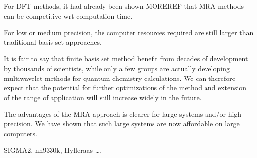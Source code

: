 \documentclass[%
 aip,
 amsmath,amssymb,
 reprint,%
]{revtex4-1}
\begin{document}

For DFT methods, it had already been shown \cite{bischoff2019} MOREREF that MRA methods can be competitive wrt computation time.

For low or medium precision, the computer resources required are still larger than traditional basis set approaches. 



It is fair to say that finite basis set method benefit from decades of development by thousands of scientists, while only a few groups are actually developing multiwavelet methods for quantum chemistry calculations. We can therefore expect that the potential for further optimizations of the method and extension of the range of application will still increase widely in the future.

The advantages of the MRA approach is clearer for large systems and/or high precision. We have shown that such large systems are now affordable on large computers.



\begin{acknowledgments}
SIGMA2, nn9330k, Hylleraas \dots.
\end{acknowledgments}




%
%




\end{document}
